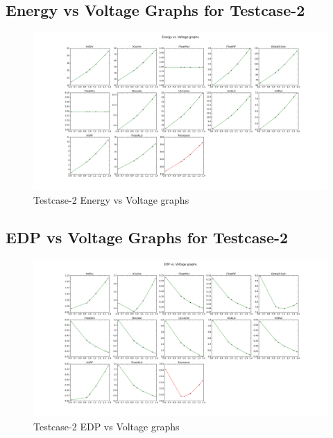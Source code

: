 \documentclass[12pt]{report}
\begin{document}
\clearpage
\subsection*{Energy vs Voltage Graphs for Testcase-2}
\begin{figure}[!htb]
\begin{sideways}

\caption{Testcase-2 Energy vs Voltage graphs}
\centering
\includegraphics[width=0.9\textheight]{bench2_figure_1.png}

\end{sideways}
\end{figure}

\clearpage
\subsection*{EDP vs Voltage Graphs for Testcase-2}
\begin{figure}[!htb]
\begin{sideways}

\caption{Testcase-2 EDP vs Voltage graphs}
\centering
\includegraphics[width=0.9\textheight]{bench2_figure_2.png}

\end{sideways}
\end{figure}
\end{document}
